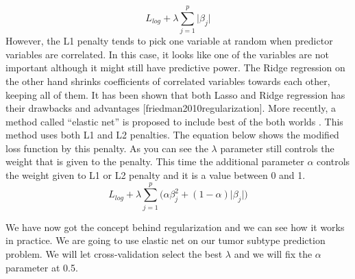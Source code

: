 \documentclass[12pt,]{krantz}
\newenvironment{Shaded}{\begin{snugshade}}{\end{snugshade}}
\newcommand{\CommentTok}[1]{\textcolor[rgb]{0.56,0.35,0.01}{\textit{#1}}}
\newcommand{\DataTypeTok}[1]{\textcolor[rgb]{0.13,0.29,0.53}{#1}}
\newcommand{\DecValTok}[1]{\textcolor[rgb]{0.00,0.00,0.81}{#1}}
\newcommand{\FloatTok}[1]{\textcolor[rgb]{0.00,0.00,0.81}{#1}}
\newcommand{\KeywordTok}[1]{\textcolor[rgb]{0.13,0.29,0.53}{\textbf{#1}}}
\newcommand{\NormalTok}[1]{#1}
\newcommand{\OperatorTok}[1]{\textcolor[rgb]{0.81,0.36,0.00}{\textbf{#1}}}
\newcommand{\StringTok}[1]{\textcolor[rgb]{0.31,0.60,0.02}{#1}}
\begin{document}
\[
L_{log}+\lambda\sum_{j=1}^p{|\beta_j}|
\]
However, the L1 penalty tends to pick one variable at random when predictor variables are correlated. In this case, it looks like one of the variables are not important although it might still have predictive power. The Ridge regression on the other hand shrinks coefficients of correlated variables towards each other, keeping all of them. It has been shown that both Lasso and Ridge regression has their drawbacks and advantages {[}friedman2010regularization{]}. More recently, a method called ``elastic net'' is proposed to include best of the both worlds \citep{zou2005regularization}. This method uses both L1 and L2 penalties. The equation below shows the modified loss function by this penalty. As you can see the \(\lambda\) parameter still controls the weight that is given to the penalty. This time the additional parameter \(\alpha\) controls the weight given to L1 or L2 penalty and it is a value between 0 and 1.
\[
L_{log}+\lambda\sum_{j=1}^p{(\alpha\beta_j^2+(1-\alpha)|\beta_j}|)
\]

We have now got the concept behind regularization and we can see how it works in practice. We are going to use elastic net on our tumor subtype prediction problem. We will let cross-validation select the best \(\lambda\) and we will fix the \(\alpha\) parameter at 0.5.

\begin{Shaded}
\end{Shaded}
\end{document}
